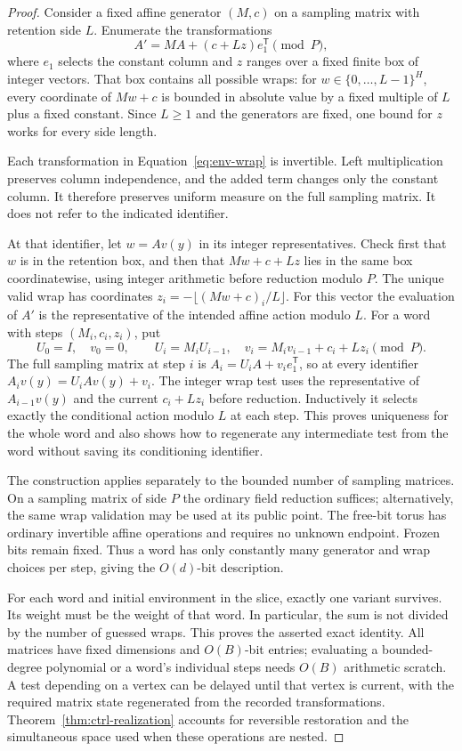 \begin{proof}
Consider a fixed affine generator $(M,c)$ on a sampling matrix with retention
side $L$. Enumerate the transformations
\begin{equation}\label{eq:env-wrap}
A'=MA+(c+Lz)e_1^{\mathsf T}\pmod P,
\end{equation}
where $e_1$ selects the constant column and $z$ ranges over a fixed
finite box of integer vectors. That box contains all possible wraps:
for $w\in\{0,\ldots,L-1\}^H$, every coordinate of $Mw+c$ is bounded
in absolute value by a fixed multiple of $L$ plus a fixed constant.
Since $L\ge1$ and the generators are fixed, one bound for $z$ works
for every side length.

Each transformation in Equation~\eqref{eq:env-wrap} is invertible.
Left multiplication preserves column independence, and the added
term changes only the constant column. It therefore preserves uniform
measure on the full sampling matrix. It does not refer to the indicated
identifier.

At that identifier, let $w=Av(y)$ in its integer representatives.
Check first that $w$ is in the retention box, and then that
$Mw+c+Lz$ lies in the same box coordinatewise, using integer arithmetic
before reduction modulo $P$. The unique valid wrap has coordinates
$z_i=-\lfloor(Mw+c)_i/L\rfloor$. For this vector the evaluation of
$A'$ is the representative of the intended affine action modulo $L$.
For a word with steps $(M_i,c_i,z_i)$, put
\[
 U_0=I,\quad v_0=0,\qquad
 U_i=M_iU_{i-1},\quad
 v_i=M_iv_{i-1}+c_i+Lz_i\pmod P.
\]
The full sampling matrix at step $i$ is
$A_i=U_iA+v_i e_1^{\mathsf T}$, so at every identifier
$A_iv(y)=U_iAv(y)+v_i$. The integer wrap test uses the
representative of $A_{i-1}v(y)$ and the current $c_i+Lz_i$
before reduction. Inductively it selects exactly the conditional
action modulo $L$ at each step. This proves uniqueness for the
whole word and also shows how to regenerate any intermediate
test from the word without saving its conditioning identifier.

The construction applies separately to the bounded number of sampling matrices.
On a sampling matrix of side $P$ the ordinary field reduction suffices;
alternatively, the same wrap validation may be used at its public
point. The free-bit torus has ordinary invertible affine operations
and requires no unknown endpoint. Frozen bits remain fixed.
Thus a word has only constantly many generator and wrap choices
per step, giving the $O(d)$-bit description.

For each word and initial environment in the slice, exactly one
variant survives. Its weight must be the weight of that word.
In particular, the sum is not divided by the number of guessed
wraps. This proves the asserted exact identity.
All matrices have fixed dimensions and $O(B)$-bit entries;
evaluating a bounded-degree polynomial or a word's individual steps
needs $O(B)$ arithmetic scratch. A test depending on a vertex can
be delayed until that vertex is current, with the required matrix
state regenerated from the recorded transformations.
Theorem~\ref{thm:ctrl-realization} accounts for reversible restoration
and the simultaneous space used when these operations are nested.
\end{proof}

